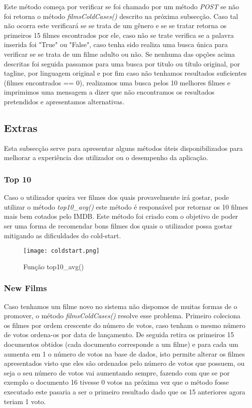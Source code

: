 Este método começa por verificar se foi chamado por um método \textit{POST} se não foi retorna o método \textit{filmsColdCases()} descrito na próxima subsecção. Caso tal não ocorra este verificará se se trata de um gênero e se se tratar retorna os primeiros 15 filmes escontrados por ele, caso não se trate verifica se a palavra inserida foi "True" ou "False", caso tenha sido realiza uma busca única para verificar se se trata de um filme adulto ou não. Se nenhuma das opções acima descritas foi seguida passamos para uma busca por titulo ou título original, por tagline, por linguagem original e por fim caso não tenhamos resultados suficientes (filmes encontrados == 0), realizamos uma busca pelos 10 melhores filmes e imprimimos uma mensagem a dizer que não encontramos os resultados pretendidos e apresentamos alternativas. 


\subsection{Extras}

Esta subsecção serve para apresentar alguns métodos úteis disponibilizados para melhorar a experiência dos utilizador ou o desempenho da aplicação. 

\subsubsection{Top 10}

\par Caso o utilizador queira ver filmes dos quais provavelmente irá gostar, pode utilizar o método \textit{top10\_avg()} este método é responsável por retornar os 10 filmes mais bem cotados pelo IMDB. Este método foi criado com o objetivo de poder ser uma forma de recomendar bons filmes dos quais o utilizador possa gostar mitigando as dificuldades do cold-start.

\begin{figure}[H]
\centering
\texttt{[image: coldstart.png]}
\caption {Função top10\_avg()}
\label {fig04}
\end{figure}

\subsubsection{New Films}

\par Caso tenhamos um filme novo no sistema não dispomos de muitas formas de o promover, o método \textit{filmsColdCases()} resolve esse problema. Primeiro coleciona os filmes por ordem crescente do número de votos, caso tenham o mesmo número de votos ordena-os por data de lançamento. De seguida retira os primeiros 15 documentos obtidos (cada documento corresponde a um filme) e para cada um aumenta em 1 o número de votos na base de dados, isto permite alterar os filmes apresentados visto que eles são ordenados pelo número de votos que possuem, ou seja o seu número de votos vai aumentando sempre, fazendo com que se por exemplo o documento 16 tivesse 0 votos na próxima vez que o método fosse executado este pasaria a ser o primeiro resultado  dado que os 15 anteriores agora teriam 1 voto.

